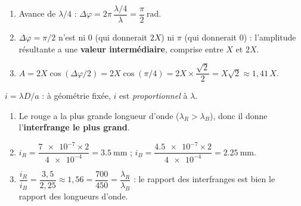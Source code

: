 \documentclass[11pt,a4paper]{article}
\begin{document}
\begin{corrige}
\begin{enumerate}[label=\alph*)]
  \item Avance de $\lambda/4$ : $\Delta\varphi=2\pi\,\dfrac{\lambda/4}{\lambda}=\dfrac{\pi}{2}\ \si{\radian}.$
  \item $\Delta\varphi=\pi/2$ n'est ni $0$ (qui donnerait $2X$) ni $\pi$ (qui donnerait $0$) :
        l'amplitude résultante a une \textbf{valeur intermédiaire}, comprise entre $X$ et $2X$.
  \item $A=2X\cos(\Delta\varphi/2)=2X\cos(\pi/4)=2X\times\dfrac{\sqrt2}{2}=X\sqrt2\approx 1{,}41\,X.$
\end{enumerate}
\end{corrige}

\begin{corrige}
$i=\lambda D/a$ : à géométrie fixée, $i$ est \emph{proportionnel} à $\lambda$.
\begin{enumerate}[label=\alph*)]
  \item Le rouge a la plus grande longueur d'onde ($\lambda_R>\lambda_B$), donc il donne
        l'\textbf{interfrange le plus grand}.
  \item $i_R=\dfrac{\num{7e-7}\times 2}{\num{4e-4}}=\SI{3.5}{\milli\metre}$ ;
        $i_B=\dfrac{\num{4.5e-7}\times 2}{\num{4e-4}}=\SI{2.25}{\milli\metre}.$
  \item $\dfrac{i_R}{i_B}=\dfrac{3{,}5}{2{,}25}\approx 1{,}56=\dfrac{700}{450}=\dfrac{\lambda_R}{\lambda_B}$ :
        le rapport des interfranges est bien le rapport des longueurs d'onde.
\end{enumerate}
\end{corrige}
\end{document}
